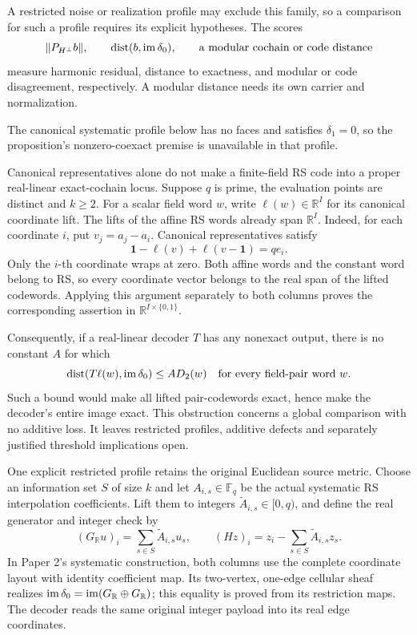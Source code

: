 A restricted noise or realization profile may exclude this family, so a
comparison for such a profile requires its explicit hypotheses. The scores
\[
  \|P_{H^\perp}b\|,\qquad
  \operatorname{dist}(b,\operatorname{im}\delta_0),\qquad
  \text{a modular cochain or code distance}
\]
measure harmonic residual, distance to exactness, and modular or code
disagreement, respectively. A modular distance needs its own carrier and
normalization.

The canonical systematic profile below has no faces and satisfies
\(\delta_1=0\), so the proposition's nonzero-coexact premise is
unavailable in that profile.


Canonical representatives alone do not make a finite-field RS code into a
proper real-linear exact-cochain locus. Suppose \(q\) is prime, the evaluation
points are distinct and \(k\ge2\). For a scalar field word \(w\), write
\(\ell(w)\in\mathbb R^I\) for its canonical coordinate lift. The lifts of
the affine RS words already span \(\mathbb R^I\). Indeed, for each coordinate
\(i\), put \(v_j=a_j-a_i\). Canonical representatives satisfy
\[
 \mathbf1-\ell(v)+\ell(v-\mathbf1)=q e_i.
\]
Only the \(i\)-th coordinate wraps at zero. Both affine words and the
constant word belong to RS, so every coordinate vector belongs to the real
span of the lifted codewords. Applying this argument separately to both
columns proves the corresponding assertion in \(\mathbb R^{I\times\{0,1\}}\).

Consequently, if a real-linear decoder \(T\) has any nonexact output, there
is no constant \(A\) for which
\[
 \operatorname{dist}(T\ell(w),\operatorname{im}\delta_0)\le A D_2(w)
 \quad\text{for every field-pair word }w.
\]
Such a bound would make all lifted pair-codewords exact, hence make the
decoder's entire image exact. This obstruction concerns a global comparison
with no additive loss. It leaves restricted profiles, additive defects and
separately justified threshold implications open.

One explicit restricted profile retains the original Euclidean source metric.
Choose an information set \(S\) of size \(k\) and let \(A_{i,s}\in\mathbb F_q\)
be the actual systematic RS interpolation coefficients. Lift them to integers
\(\widetilde A_{i,s}\in[0,q)\), and define the real generator and integer check
by
\[
 (G_{\mathbb R}u)_i=\sum_{s\in S}\widetilde A_{i,s}u_s,
 \qquad (Hz)_i=z_i-\sum_{s\in S}\widetilde A_{i,s}z_s.
\]
In Paper 2's systematic construction, both columns use the complete coordinate
layout with identity coefficient map. Its two-vertex, one-edge cellular sheaf realizes
\(\operatorname{im}\delta_0=\operatorname{im}(G_{\mathbb R}\oplus G_{\mathbb R})\); this equality is
proved from its restriction maps. The decoder reads the same original
integer payload into its real edge coordinates.

